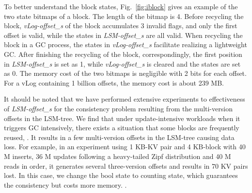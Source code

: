 \documentclass[sigconf]{acmart}
\begin{document}
To better understand the block states, Fig.~\ref{fig:iblock} gives an example of the two state bitmaps of a block. The length of the bitmap is 4. Before recycling the block, \textit{vLog-offset\_s} of the block accumulates 3 invalid flags, and only the first offset is valid, while the states in \textit{LSM-offset\_s} are all valid. When recycling the block in a GC process, the states in \textit{vLog-offset\_s} facilitate realizing a lightweight GC. After finishing the recycling of the block, correspondingly, the first position in \textit{LSM-offset\_s} is set as 1, while \textit{vLog-offset\_s} is cleared and the states are set as 0. The memory cost of the two bitmaps is negligible with 2 bits for each offset. For a vLog containing 1 billion offsets, the memory cost is about 239 MB.

It should be noted that we have performed extensive experiments to effectiveness of \textit{LSM-offset\_s} for the consistency problem resulting from the multi-version offsets in the LSM-tree. We find that under update-intensive workloads when it triggers GC intensively, there exists a situation that some blocks are frequently reused, {\color{red}{which is aroused by the higher compaction priority of hot data in the LSM-tree (i.e., the compaction requirement of $L_0$ is determined by the number of SSTs)}}. It results in a few multi-version offsets in the LSM-tree causing data loss. For example, in an experiment using 1 KB-KV pair and 4 KB-block with 40 M inserts, 36 M updates following a heavy-tailed Zipf distribution and 40 M reads in order, it generates several three-version offsets and results in 70 KV pairs lost. In this case, we change the bool state to counting state, which guarantees the consistency but costs more memory. {}. {}
\end{document}
